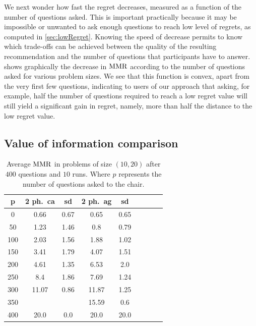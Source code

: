 \documentclass[sigconf, anonymous]{aamas}
\begin{document}
We next wonder how fast the regret decreases, measured as a function of the number of questions asked. This is important practically because it may be impossible or unwanted to ask enough questions to reach low level of regrets, as computed in \cref{sec:lowRegret}. Knowing the speed of decrease permits to know which trade-offs can be achieved between the quality of the resulting recommendation and the number of questions that participants have to answer.  shows graphically the decrease in $\operatorname{MMR}$ according to the number of questions asked for various problem sizes. We see that this function is convex, apart from the very first few questions, indicating to users of our approach that asking, for example, half the number of questions required to reach a low regret value will still yield a significant gain in regret, namely, more than half the distance to the low regret value.

\subsection{Value of information comparison}
\begin{table}
	\begin{center}
		\begin{tabular}{S[table-figures-integer=3, table-number-alignment = right, table-figures-decimal=0]S[table-number-alignment = right]@{ ± }S[table-number-alignment = left]S[table-number-alignment = right]@{ ± }S[table-number-alignment = left]S[table-number-alignment = right]@{ ± }S[table-number-alignment = left]S[table-number-alignment = right]@{ ± }S[table-number-alignment = left]}
			\toprule
			{p} & {2 ph.\ ca} & {sd} & {2 ph.\ ag} & {sd} \\
			 & 0.66 & 0.67 & 0.65 & 0.65  \\
			50 & 1.23 & 1.46 & 0.8 & 0.79 \\
			100 & 2.03 & 1.56 & 1.88 & 1.02  \\
			150 & 3.41 & 1.79 & 4.07 & 1.51 \\
			200 & 4.61	& 1.35  & 6.53 & 2.0  \\
			250 & 8.4 & 1.86 & 	7.69 & 1.24 \\
			300 &11.07 & 0.86& 11.87 & 1.25 \\
			350 &&&15.59 & 0.6 \\
			400 &20.0 & 0.0 & 20.0 & 20.0 \\
			\bottomrule
		\end{tabular}
	\end{center}
	\caption{Average $\operatorname{MMR}$ in problems of size $(10, 20)$ after $400$ questions and $10$ runs. Where $p$ represents the number of questions asked to the chair.}
	\label{tab:twoP400}
\end{table}
\end{document}
